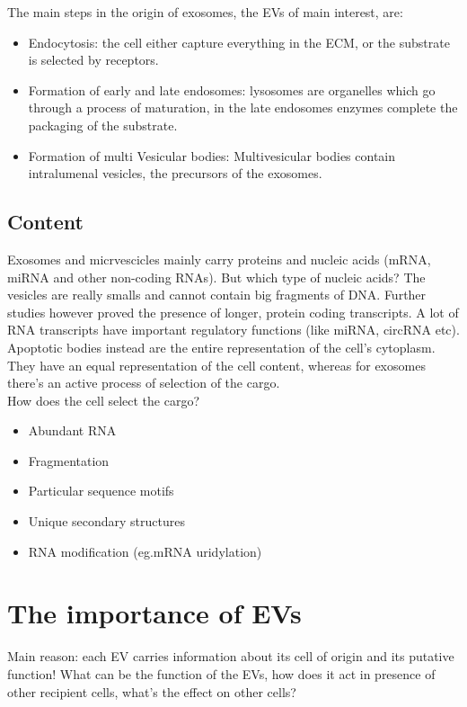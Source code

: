 The main steps in the origin of exosomes, the EVs of main interest, are:
\begin{itemize}
\item Endocytosis: the cell either capture everything in the ECM, or the substrate is selected by receptors.
\item Formation of early and late endosomes: lysosomes are organelles which go through a process of maturation, in the late endosomes enzymes complete the packaging of the substrate.
\item Formation of multi Vesicular bodies: Multivesicular bodies contain intralumenal vesicles, the precursors of the exosomes. 
\end{itemize}

\subsection{Content}
Exosomes and micrvescicles mainly carry proteins and nucleic acids (mRNA, miRNA and other non-coding RNAs). But which type of nucleic acids? The vesicles are really smalls and cannot contain big fragments of DNA. Further studies however proved the presence of longer, protein coding transcripts. A lot of RNA transcripts have important regulatory functions (like miRNA, circRNA etc).
\\
Apoptotic bodies instead are the entire representation of the cell's cytoplasm. They have an equal representation of the cell content, whereas for exosomes there's an active process of selection of the cargo.
\\
How does the cell select the cargo?
\begin{itemize}
\item Abundant RNA
\item Fragmentation
\item Particular sequence motifs
\item Unique secondary structures
\item RNA modification (eg.mRNA uridylation)
\end{itemize}


\section{The importance of EVs}
Main reason: each EV carries information about its cell of origin and its putative function! What can be the function of the EVs, how does it act in presence of other recipient cells, what's the effect on other cells?

